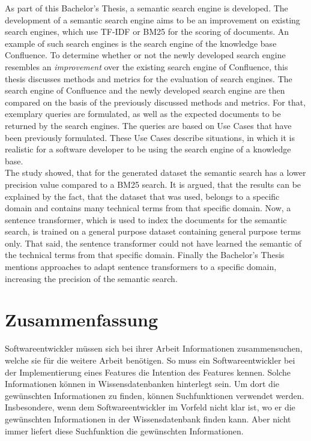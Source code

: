 As part of this Bachelor's Thesis, a semantic search engine is developed.
The development of a semantic search engine aims to be an improvement on existing search engines, which use TF-IDF or BM25 for the scoring of documents.
An example of such search engines is the search engine of the knowledge base Confluence.
To determine whether or not the newly developed search engine resembles an \textit{improvement} over the existing search engine of Confluence, this thesis discusses methods and metrics for the evaluation of search engines.
The search engine of Confluence and the newly developed search engine are then compared on the basis of the previously discussed methods and metrics.
For that, exemplary queries are formulated, as well as the expected documents to be returned by the search engines.
The queries are based on Use Cases that have been previously formulated.
These Use Cases describe situations, in which it is realistic for a software developer to be using the search engine of a knowledge base.\\

The study showed, that for the generated dataset the semantic search has a lower precision value compared to a BM25 search.
It is argued, that the results can be explained by the fact, that the dataset that was used, belongs to a specific domain and contains many technical terms from that specific domain.
Now, a sentence transformer, which is used to index the documents for the semantic search, is trained on a general purpose dataset containing general purpose terms only.
That said, the sentence transformer could not have learned the semantic of the technical terms from that specific domain.
Finally the Bachelor's Thesis mentions approaches to adapt sentence transformers to a specific domain, increasing the precision of the semantic search.

\section*{Zusammenfassung}
Softwareentwickler müssen sich bei ihrer Arbeit Informationen zusammensuchen, welche sie für die weitere Arbeit benötigen.
So muss ein Softwareentwickler bei der Implementierung eines Features die Intention des Features kennen.
Solche Informationen können in Wissensdatenbanken hinterlegt sein.
Um dort die gewünschten Informationen zu finden, können Suchfunktionen verwendet werden.
Insbesondere, wenn dem Softwareentwickler im Vorfeld nicht klar ist, wo er die gewünschten Informationen in der Wissensdatenbank finden kann.
Aber nicht immer liefert diese Suchfunktion die gewünschten Informationen.\\


